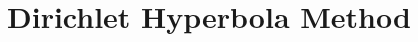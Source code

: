 \documentclass[elemannt.tex]{subfile}
\begin{document}
	\section{Dirichlet Hyperbola Method}
\end{document}
